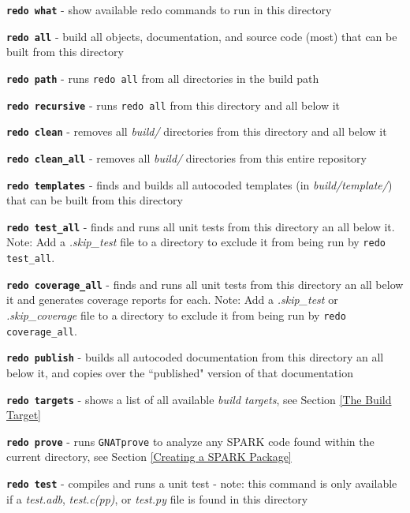 \vspace{5mm} %
\begin{spaceditemize}
  \item \textbf{\texttt{redo what}} - show available redo commands to run in this directory
  \item \textbf{\texttt{redo all}} - build all objects, documentation, and source code (most) that can be built from this directory
  \item \textbf{\texttt{redo path}} - runs \texttt{redo all} from all directories in the build path
  \item \textbf{\texttt{redo recursive}} - runs \texttt{redo all} from this directory and all below it
  \item \textbf{\texttt{redo clean}} - removes all \textit{build/} directories from this directory and all below it
  \item \textbf{\texttt{redo clean\_all}} - removes all \textit{build/} directories from this entire repository
  \item \textbf{\texttt{redo templates}} - finds and builds all autocoded templates (in \textit{build/template/}) that can be built from this directory
  \item \textbf{\texttt{redo test\_all}} - finds and runs all unit tests from this directory an all below it. Note: Add a \textit{.skip\_test} file to a directory to exclude it from being run by \texttt{redo test\_all}.
  \item \textbf{\texttt{redo coverage\_all}} - finds and runs all unit tests from this directory an all below it and generates coverage reports for each. Note: Add a \textit{.skip\_test} or \textit{.skip\_coverage} file to a directory to exclude it from being run by \texttt{redo coverage\_all}.
  \item \textbf{\texttt{redo publish}} - builds all autocoded documentation from this directory an all below it, and copies over the ``published" version of that documentation
  \item \textbf{\texttt{redo targets}} - shows a list of all available \textit{build targets}, see Section \ref{The Build Target}
  \item \textbf{\texttt{redo prove}} - runs \texttt{GNATprove} to analyze any SPARK code found within the current directory, see Section \ref{Creating a SPARK Package}
  \item \textbf{\texttt{redo test}} - compiles and runs a unit test - note: this command is only available if a \textit{test.adb}, \textit{test.c(pp)}, or \textit{test.py} file is found in this directory

\end{spaceditemize}
